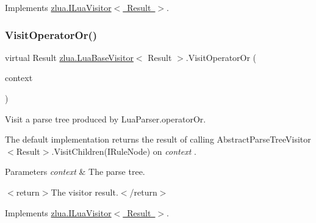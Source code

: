 Implements \mbox{\hyperlink{interfacezlua_1_1_i_lua_visitor_a3d3f85dff116b4052af62e3d712fb958}{zlua.\+I\+Lua\+Visitor$<$ Result $>$}}.

\mbox{\label{classzlua_1_1_lua_base_visitor_a1ab126271c0f9f8a86946bb1f38942ee}} 
\subsubsection{\texorpdfstring{Visit\+Operator\+Or()}{VisitOperatorOr()}}
{\footnotesize\ttfamily virtual Result \mbox{\hyperlink{classzlua_1_1_lua_base_visitor}{zlua.\+Lua\+Base\+Visitor}}$<$ Result $>$.Visit\+Operator\+Or (\begin{DoxyParamCaption}\item[{\mbox{[}\+Not\+Null\mbox{]} \mbox{\hyperlink{classzlua_1_1_lua_parser_1_1_operator_or_context}{Lua\+Parser.\+Operator\+Or\+Context}}}]{context }\end{DoxyParamCaption})\hspace{0.3cm}{\ttfamily [virtual]}}



Visit a parse tree produced by Lua\+Parser.\+operator\+Or. 

The default implementation returns the result of calling Abstract\+Parse\+Tree\+Visitor$<$\+Result$>$.\+Visit\+Children(\+I\+Rule\+Node) on {\itshape context} . 


\begin{DoxyParams}{Parameters}
{\em context} & The parse tree.\\
\hline
\end{DoxyParams}
$<$return$>$The visitor result.$<$/return$>$ 

Implements \mbox{\hyperlink{interfacezlua_1_1_i_lua_visitor_a35b6ad774142fb2dca6616d513025703}{zlua.\+I\+Lua\+Visitor$<$ Result $>$}}.

\mbox{\label{classzlua_1_1_lua_base_visitor_a9fae59028299794afc9f4cbaa8db8cb9}} 
